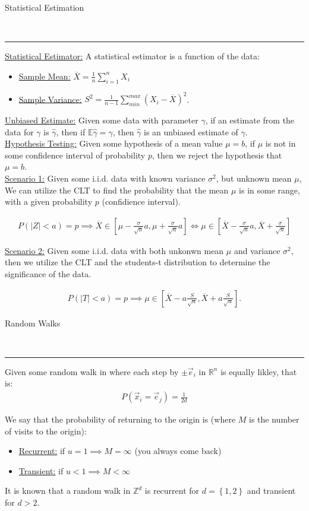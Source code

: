 \documentclass{article}
\newcommand{\header}[1]{\begin{large}\noindent #1\end{large}\\\rule{\textwidth}{0.5pt}}
\newcommand{\sheader}[1]{\underline{#1:}}
\newcommand{\gap}{\medskip\\}
\newcommand{\curly}[1]{\left\{#1\right\}}
\newcommand{\ds}{\displaystyle}
\begin{document}
\header{Statistical Estimation}

\sheader{Statistical Estimator} A statistical estimator is a 
function of the data:
\begin{itemize}
    \item \sheader{Sample Mean} $\ds \overline{X} = \frac{1}{n} \sum_{i = 1}^{n}X_i$
    \item \sheader{Sample Variance} $\ds S^2 = \frac{1}{n - 1} \sum_{min}^{max}(X_i - \overline{X})^2$.
\end{itemize}

\sheader{Unbiased Estimate} Given some data with parameter $\gamma$,
if an estimate from the data for $\gamma$ is $\hat{\gamma}$, then 
if $\mathbb{E}\hat{\gamma} = \gamma$, then $\hat{\gamma}$ is an 
unbiased estimate of $\gamma$.
\gap
\sheader{Hypothesis Testing} Given some hypothesis of a mean value $\mu = b$,
if $\mu$ is not in some confidence interval of probability $p$, then we 
reject the hypothesis that $\mu = b$.
\gap 
\sheader{Scenario 1} Given some i.i.d. data with known variance $\sigma^2$, but unknown mean $\mu$,
We can utilize the CLT to find the probability that the mean $\mu$ is in some
range, with a given probability $p$ (confidience interval).

\begin{align*}
    P(|Z| < a) = p \implies \overline{X} \in \left[\mu - \frac{\sigma}{\sqrt{n}} a, \mu + \frac{\sigma}{\sqrt{n}} a \right] \iff \mu \in \left[\overline{X} - \frac{\sigma}{\sqrt{n}} a, \overline{X} + \frac{\sigma}{\sqrt{n}}\right]
\end{align*}

\sheader{Scenario 2} Given some i.i.d. data with both unkonwn mean $\mu$ and 
variance $\sigma^2$, then we utilize the CLT and the students-t distribution 
to determine the significance of the data.

\begin{align*}
    P(|T| < a) = p \implies \mu \in \left[\overline{X} - a \frac{S}{\sqrt{n}}, \overline{X} + a \frac{S}{\sqrt{n}}\right].
\end{align*}

\header{Random Walks}

Given some random walk in where each step by $\pm \vec{e}_i$ in $\mathbb{R}^n$ is equally likley,
that is:
\begin{align*}
    P(\vec{x}_i = \vec{e}_j) = \frac{1}{2d}
\end{align*}

We say that the probability of returning to the origin is (where $M$ is the number of visits to the origin):
\begin{itemize}
    \item \sheader{Recurrent} if $u =1 \implies M = \infty$ (you always come back)
    \item \sheader{Transient} if $u < 1 \implies M < \infty$
\end{itemize}
It is known that a random walk in $\mathbb{Z}^d$ is recurrent for 
$d = \curly{1, 2}$ and transient for $d > 2$.
\end{document}
